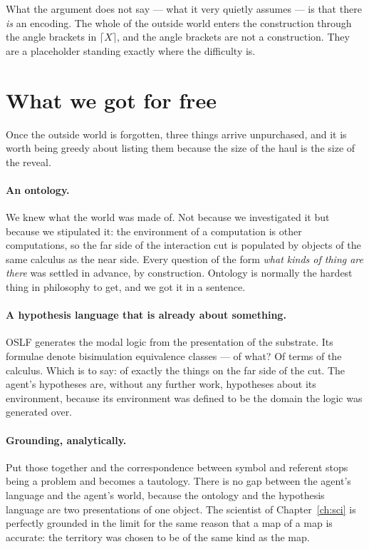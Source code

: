 What the argument does not say --- what it very quietly assumes ---
is that there \emph{is} an encoding.
The whole of the outside world enters the construction through the
angle brackets in $\lceil X \rceil$, and the angle brackets are not
a construction.
They are a placeholder standing exactly where the difficulty is.

\section{What we got for free}
\label{sec:free-lunch}

Once the outside world is forgotten, three things arrive
unpurchased, and it is worth being greedy about listing them
because the size of the haul is the size of the reveal.

\paragraph{An ontology.}
We knew what the world was made of.
Not because we investigated it but because we stipulated it: the
environment of a computation is other computations, so the far side
of the interaction cut is populated by objects of the same calculus
as the near side.
Every question of the form \emph{what kinds of thing are there} was
settled in advance, by construction.
Ontology is normally the hardest thing in philosophy to get, and we
got it in a sentence.

\paragraph{A hypothesis language that is already about something.}
OSLF generates the modal logic from the presentation of the
substrate.
Its formulae denote bisimulation equivalence classes --- of what?
Of terms of the calculus.
Which is to say: of exactly the things on the far side of the cut.
The agent's hypotheses are, without any further work, hypotheses
about its environment, because its environment was defined to be
the domain the logic was generated over.

\paragraph{Grounding, analytically.}
Put those together and the correspondence between symbol and
referent stops being a problem and becomes a tautology.
There is no gap between the agent's language and the agent's world,
because the ontology and the hypothesis language are two
presentations of one object.
The scientist of Chapter~\ref{ch:sci} is perfectly grounded in the
limit for the same reason that a map of a map is accurate: the
territory was chosen to be of the same kind as the map.

